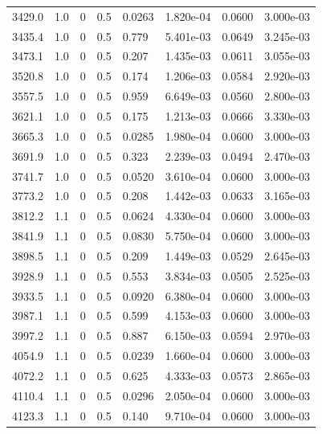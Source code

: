 \documentclass[preview]{standalone}
\begin{document}
{{{{\begin{tabular}{L{1.2cm}C{1.2cm} C{0.3cm}C{0.5cm} C{1.4cm}C{1.4cm} C{1.4cm}C{1.4cm}}
  3429.0  &   1.0  & 0     & 0.5 &  0.0263  & 1.820e-04  & 0.0600 &  3.000e-03   \\ 
  3435.4  &   1.0  & 0     & 0.5 &  0.779  & 5.401e-03  & 0.0649 &  3.245e-03   \\ 
  3473.1  &   1.0  & 0     & 0.5 &  0.207  & 1.435e-03  & 0.0611 &  3.055e-03   \\ 
  3520.8  &   1.0  & 0     & 0.5 &  0.174  & 1.206e-03  & 0.0584 &  2.920e-03   \\ 
  3557.5  &   1.0  & 0     & 0.5 &  0.959  & 6.649e-03  & 0.0560 &  2.800e-03   \\ 
  3621.1  &   1.0  & 0     & 0.5 &  0.175  & 1.213e-03  & 0.0666 &  3.330e-03   \\ 
  3665.3  &   1.0  & 0     & 0.5 &  0.0285  & 1.980e-04  & 0.0600 &  3.000e-03   \\ 
  3691.9  &   1.0  & 0     & 0.5 &  0.323  & 2.239e-03  & 0.0494 &  2.470e-03   \\ 
  3741.7  &   1.0  & 0     & 0.5 &  0.0520  & 3.610e-04  & 0.0600 &  3.000e-03   \\ 
  3773.2  &   1.0  & 0     & 0.5 &  0.208  & 1.442e-03  & 0.0633 &  3.165e-03   \\ 
  3812.2  &   1.1  & 0     & 0.5 &  0.0624  & 4.330e-04  & 0.0600 &  3.000e-03   \\ 
  3841.9  &   1.1  & 0     & 0.5 &  0.0830  & 5.750e-04  & 0.0600 &  3.000e-03   \\ 
  3898.5  &   1.1  & 0     & 0.5 &  0.209  & 1.449e-03  & 0.0529 &  2.645e-03   \\ 
  3928.9  &   1.1  & 0     & 0.5 &  0.553  & 3.834e-03  & 0.0505 &  2.525e-03   \\ 
  3933.5  &   1.1  & 0     & 0.5 &  0.0920  & 6.380e-04  & 0.0600 &  3.000e-03   \\ 
  3987.1  &   1.1  & 0     & 0.5 &  0.599  & 4.153e-03  & 0.0600 &  3.000e-03   \\ 
  3997.2  &   1.1  & 0     & 0.5 &  0.887  & 6.150e-03  & 0.0594 &  2.970e-03   \\ 
  4054.9  &   1.1  & 0     & 0.5 &  0.0239  & 1.660e-04  & 0.0600 &  3.000e-03   \\ 
  4072.2  &   1.1  & 0     & 0.5 &  0.625  & 4.333e-03  & 0.0573 &  2.865e-03   \\ 
  4110.4  &   1.1  & 0     & 0.5 &  0.0296  & 2.050e-04  & 0.0600 &  3.000e-03   \\ 
  4123.3  &   1.1  & 0     & 0.5 &  0.140  & 9.710e-04  & 0.0600 &  3.000e-03   \\ 

\end{tabular}}}}}
\end{document}
